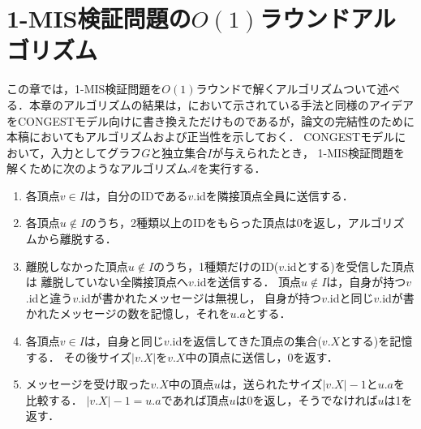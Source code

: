 \documentclass[12pt]{thesis}
\newcommand{\CONGEST}{\textsf{CONGEST}}
\theoremstyle{definition}
\begin{document}
\chapter{1-MIS検証問題の$O(1)$ラウンドアルゴリズム}
この章では，1-MIS検証問題を$O(1)$ラウンドで解くアルゴリズムついて述べる．本章のアルゴリズムの結果は，\cite{tanaka2019self}において示されている手法と同様のアイデアを{\CONGEST}モデル向けに書き換えただけものであるが，論文の完結性のために本稿においてもアルゴリズムおよび正当性を示しておく．
{\CONGEST}モデルにおいて，入力としてグラフ$G$と独立集合$I$が与えられたとき，
1-MIS検証問題を解くために次のようなアルゴリズム$\mathcal{A}$を実行する．
\begin{enumerate}
\item 各頂点$v \in I$は，自分のIDである$v$.idを隣接頂点全員に送信する．
\item 各頂点$u \notin I$のうち，2種類以上のIDをもらった頂点は0を返し，アルゴリズムから離脱する．
\item 離脱しなかった頂点$u \notin I$のうち，1種類だけのID($v$.idとする)を受信した頂点は
離脱していない全隣接頂点へ$v$.idを送信する．
頂点$u \notin I$は，自身が持つ$v$.idと違う$v$.idが書かれたメッセージは無視し，
自身が持つ$v$.idと同じ$v$.idが書かれたメッセージの数を記憶し，それを$u.a$とする．
\item 各頂点$v \in I$は，自身と同じ$v$.idを返信してきた頂点の集合($v.X$とする)を記憶する．
その後サイズ$|v.X|$を$v.X$中の頂点に送信し，0を返す．
\item メッセージを受け取った$v.X$中の頂点$u$は，送られたサイズ$|v.X| - 1$と$u.a$を比較する．
$|v.X | - 1 = u.a$であれば頂点$u$は$0$を返し，そうでなければ$u$は1を返す．
\end{enumerate}
\end{document}
